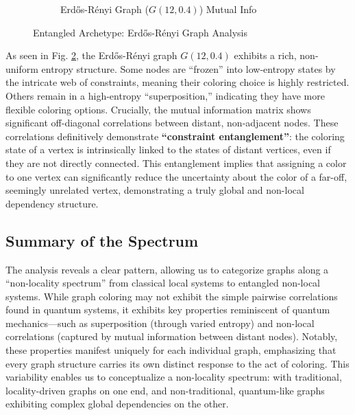 \documentclass[12pt, letterpaper]{article}
\begin{document}
\begin{figure}[H]
\begin{subfigure}[b]{0.48\textwidth}
        \caption{Erdős-Rényi Graph ($G(12,0.4)$) Mutual Info}
        \label{fig:erdos_mi}
    \end{subfigure}
    \caption{Entangled Archetype: Erdős-Rényi Graph Analysis}
    \label{fig:erdos_analysis}
\end{figure}

As seen in Fig. \ref{fig:erdos_analysis}, the Erdős-Rényi graph $G(12, 0.4)$ exhibits a rich, non-uniform entropy structure. Some nodes are ``frozen'' into low-entropy states by the intricate web of constraints, meaning their coloring choice is highly restricted. Others remain in a high-entropy ``superposition,'' indicating they have more flexible coloring options. Crucially, the mutual information matrix shows significant off-diagonal correlations between distant, non-adjacent nodes. These correlations definitively demonstrate \textbf{``constraint entanglement''}: the coloring state of a vertex is intrinsically linked to the states of distant vertices, even if they are not directly connected. This entanglement implies that assigning a color to one vertex can significantly reduce the uncertainty about the color of a far-off, seemingly unrelated vertex, demonstrating a truly global and non-local dependency structure.

\subsection{Summary of the Spectrum}
The analysis reveals a clear pattern, allowing us to categorize graphs along a ``non-locality spectrum'' from classical local systems to entangled non-local systems. While graph coloring may not exhibit the simple pairwise correlations found in quantum systems, it exhibits key properties reminiscent of quantum mechanics—such as superposition (through varied entropy) and non-local correlations (captured by mutual information between distant nodes). Notably, these properties manifest uniquely for each individual graph, emphasizing that every graph structure carries its own distinct response to the act of coloring. This variability enables us to conceptualize a non-locality spectrum: with traditional, locality-driven graphs on one end, and non-traditional, quantum-like graphs exhibiting complex global dependencies on the other.
\end{document}
